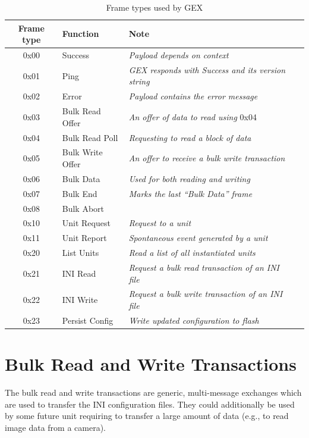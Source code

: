 \begin{table}[h]
	\centering
	\begin{tabular}{clll}
		\toprule
		\textbf{Frame type} & \textbf{Function} & \textbf{Note} \\
		\midrule
		0x00 & Success & \textit{Payload depends on context} \\
		0x01 & Ping & \textit{GEX responds with Success and its version string} \\
		0x02 & Error & \textit{Payload contains the error message} \\
		\midrule
		0x03 & Bulk Read Offer & \textit{An offer of data to read using }0x04 \\
		0x04 & Bulk Read Poll & \textit{Requesting to read a block of data} \\
		0x05 & Bulk Write Offer & \textit{An offer to receive a bulk write transaction} \\
		0x06 & Bulk Data & \textit{Used for both reading and writing} \\
		0x07 & Bulk End & \textit{Marks the last ``Bulk Data'' frame} \\
		0x08 & Bulk Abort & \textit{} \\
		\midrule
		0x10 & Unit Request & \textit{Request to a unit} \\
		0x11 & Unit Report & \textit{Spontaneous event generated by a unit} \\
		\midrule
		0x20 & List Units & \textit{Read a list of all instantiated units} \\
		0x21 & INI Read & \textit{Request a bulk read transaction of an INI file} \\
		0x22 & INI Write & \textit{Request a bulk write transaction of an INI file} \\
		0x23 & Persist Config & \textit{Write updated configuration to flash} \\
		\bottomrule
	\end{tabular}
\caption{\label{fig:tf_types}Frame types used by GEX}
\end{table}


\section{Bulk Read and Write Transactions} \label{sec:tf_bulk_rw}

The bulk read and write transactions are generic, multi-message exchanges which are used to transfer the INI configuration files. They could additionally be used by some future unit requiring to transfer a large amount of data (e.g., to read image data from a camera).

